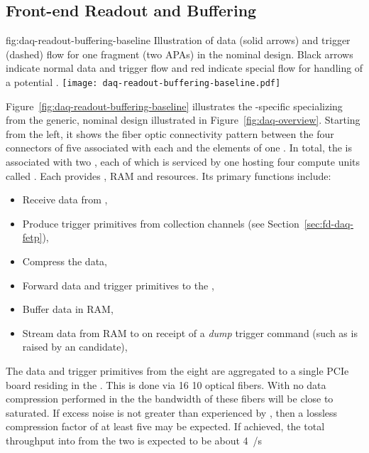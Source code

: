 

\subsection{Front-end Readout and Buffering}
\label{sec:fd-daq-fero}


\begin{dunefigure}{fig:daq-readout-buffering-baseline}
  {Illustration of data (solid arrows) and trigger (dashed) flow for
    one \single {} fragment (two APAs) in the nominal design. 
    Black arrows indicate normal data and trigger flow and red indicate special flow
    for handling of a potential .  } %
  \texttt{[image: daq-readout-buffering-baseline.pdf]}%
\end{dunefigure}


Figure~\ref{fig:daq-readout-buffering-baseline} illustrates the
-specific  specializing from the generic,
nominal design illustrated in Figure~\ref{fig:daq-overview}.  
Starting from the left, it shows the fiber optic connectivity pattern
between the four connectors of five   associated
with each  and the elements of one  . 
In total, the  is associated with two , each of which
is serviced by one   hosting four compute
units called . 
Each  provides , RAM and  resources.
Its primary functions include:
\begin{itemize}
\item Receive data from ,
\item Produce trigger primitives from collection channels (see Section~\ref{sec:fd-daq-fetp}),
\item Compress the data,
\item Forward data and trigger primitives to the ,
\item Buffer data in RAM, 
\item Stream data from RAM to  on receipt of a \textit{dump}
  trigger command (such as is raised by an  candidate),
\end{itemize}

The data and trigger primitives from the eight  are
aggregated to a single  PCIe board residing in the
. 
This is done via \num{16} \SI{10}{\Gbps} optical fibers. 
With no data compression performed in the  the bandwidth
of these fibers will be close to saturated. 
If excess noise is not greater than experienced by \microboone{}, then a
lossless compression factor of at least five may be expected.
If achieved, the total throughput into  from the two 
is expected to be about \SI{4}{\GB/s}

